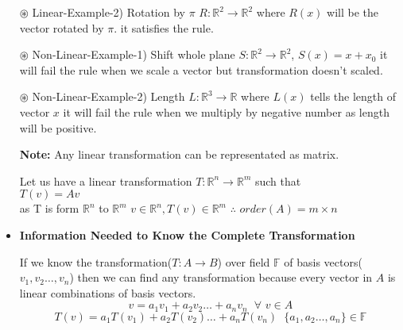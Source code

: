 \documentclass[a4paper,11pt]{article}
\numberwithin{equation}{section}
\begin{document}
\begin{itemize}
$\circledast$ Linear-Example-2) Rotation by $\pi$ $R:\mathbb{R}^2\rightarrow \mathbb{R}^2$ where $R(x)$ will be the vector rotated by $\pi$. it satisfies the rule.

$\circledast$ Non-Linear-Example-1) Shift whole plane $S: \mathbb{R}^2\rightarrow \mathbb{R}^2$, $S(x)=x+x_0$ it will fail the rule when we scale a vector but transformation doesn't scaled.

$\circledast$ Non-Linear-Example-2) Length $L: \mathbb{R}^3\rightarrow \mathbb{R}$ where $L(x)$ tells the length of vector $x$ it will fail the rule when we multiply by negative number as length will be positive.

\textbf{Note: }Any linear transformation can be representated as matrix.
\begin{center}
    Let us have a linear transformation $T:\mathbb{R}^n\rightarrow \mathbb{R}^m$ such that\\
    \vspace{6pt}
    $T(v)=Av$\\
    \vspace{6pt}
    as T is form $\mathbb{R}^n$ to $\mathbb{R}^m$ $v\in \mathbb{R}^n,T(v)\in \mathbb{R}^m$ $\therefore$ $order(A)=m\times n$
\end{center}
\vspace{7pt}
\item \textbf{Information Needed to Know the Complete Transformation}

If we know the transformation($T:A\rightarrow B$) over field $\mathbb{F}$ of basis vectors($v_1,v_2\dots,v_n$) then we can find any transformation because every vector in $A$ is linear combinations of basis vectors.
\[
v=a_1v_1+a_2v_2\dots+a_nv_n \hspace{7pt} \forall \hspace{4pt} v\in A
\]
\[
T(v)=a_1T(v_1)+a_2T(v_2)\dots+a_nT(v_n) \hspace{7pt} \{a_1,a_2\dots,a_n\}\in \mathbb{F}
\]


\end{itemize}
\end{document}
